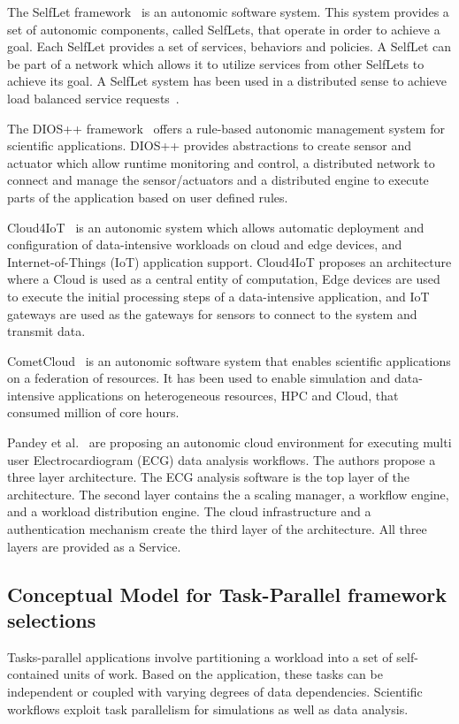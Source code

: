 {The SelfLet framework~\cite{bindelli2008building} is an autonomic software system. 
This system provides a set of autonomic components, called SelfLets, that operate 
in order to achieve a goal. Each SelfLet provides a set of services, behaviors 
and policies. A SelfLet can be part of a network which allows it to utilize 
services from other SelfLets to achieve its goal. A SelfLet system has been used 
in a distributed sense to achieve load balanced service requests~\cite{calcavecchia2010emergence}.

The DIOS++ framework~\cite{liu2003dios} offers a rule-based autonomic management 
system for scientific applications. DIOS++ provides abstractions to create sensor 
and actuator which allow runtime monitoring and control, a distributed network to 
connect and manage the sensor/actuators and a distributed engine to execute parts 
of the application based on user defined rules.

Cloud4IoT~\cite{pizzolli2016cloud4iot} is an autonomic system which allows automatic 
deployment and configuration of data-intensive workloads on cloud and edge devices, 
and Internet-of-Things (IoT) application support. Cloud4IoT proposes an architecture 
where a Cloud is used as a central entity of computation, Edge devices are used to 
execute the initial processing steps of a data-intensive application, and IoT 
gateways are used as the gateways for sensors to connect to the system and 
transmit data.

CometCloud~\cite{diazmontes2015cometcloud} is an autonomic software system that 
enables scientific applications on a federation of resources. It has been used 
to enable simulation and data-intensive applications on heterogeneous resources, 
HPC and Cloud, that consumed million of core hours.

Pandey et al.~\cite{pandey2012autonomic} are proposing an autonomic cloud 
environment for executing multi user Electrocardiogram (ECG) data analysis 
workflows. The authors propose a three layer architecture. The ECG analysis 
software is the top layer of the architecture. The second layer contains the a 
scaling manager, a workflow engine, and a workload distribution engine. The cloud 
infrastructure and a authentication mechanism create the third layer of the 
architecture. All three layers are provided as a Service.



\subsection{Conceptual Model for Task-Parallel framework selections}
Tasks-parallel applications involve partitioning a workload into a set of 
self-contained units of work. Based on the application, these tasks can be 
independent or coupled with varying degrees of data dependencies. Scientific 
workflows exploit task parallelism for simulations as well as data analysis.

}
